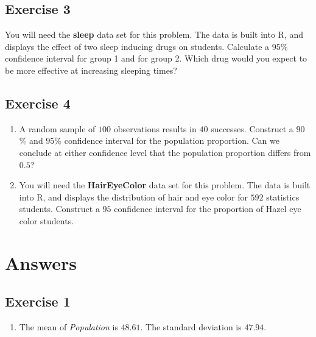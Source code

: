 \documentclass[
  letterpaper,
  DIV=11,
  numbers=noendperiod]{scrreprt}
\providecommand{\tightlist}{%
  \setlength{\itemsep}{0pt}\setlength{\parskip}{0pt}}\usepackage{longtable,booktabs,array}
\begin{document}
\hypertarget{exercise-3-22}{%
\subsection*{Exercise 3}\label{exercise-3-22}}

You will need the \textbf{sleep} data set for this problem. The data is
built into R, and displays the effect of two sleep inducing drugs on
students. Calculate a \(95\)\% confidence interval for group 1 and for
group 2. Which drug would you expect to be more effective at increasing
sleeping times?

\hypertarget{exercise-4-12}{%
\subsection*{Exercise 4}\label{exercise-4-12}}

\begin{enumerate}
\def\labelenumi{\arabic{enumi}.}
\item
  A random sample of \(100\) observations results in \(40\) successes.
  Construct a \(90\)\% and \(95\)\% confidence interval for the
  population proportion. Can we conclude at either confidence level that
  the population proportion differs from \(0.5\)?
\item
  You will need the \textbf{HairEyeColor} data set for this problem. The
  data is built into R, and displays the distribution of hair and eye
  color for \(592\) statistics students. Construct a \(95\) confidence
  interval for the proportion of Hazel eye color students.
\end{enumerate}

\hypertarget{answers-11}{%
\section{Answers}\label{answers-11}}

\hypertarget{exercise-1-23}{%
\subsection*{Exercise 1}\label{exercise-1-23}}

\begin{enumerate}
\def\labelenumi{\arabic{enumi}.}
\tightlist
\item
  The mean of \emph{Population} is \(48.61\). The standard deviation is
  \(47.94\).
\end{enumerate}
\end{document}
